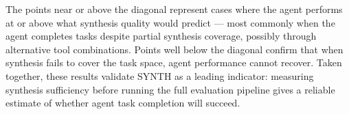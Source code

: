 The points near or above the diagonal represent cases where the agent performs at or above what synthesis quality would predict --- most commonly when the agent completes tasks despite partial synthesis coverage, possibly through alternative tool combinations. Points well below the diagonal confirm that when synthesis fails to cover the task space, agent performance cannot recover. Taken together, these results validate SYNTH as a leading indicator: measuring synthesis sufficiency before running the full evaluation pipeline gives a reliable estimate of whether agent task completion will succeed.

